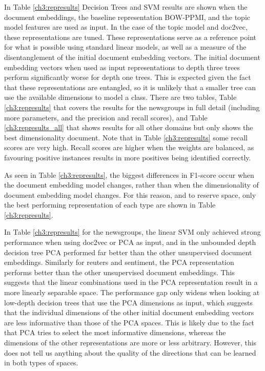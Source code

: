 In Table \ref{ch3:represults} Decision Trees and SVM results are shown when the document embeddings, the baseline representation BOW-PPMI, and the topic model features are used as input. In the case of the topic model and doc2vec, these representations are tuned. These representations serve as a reference point for what is possible using standard linear models, as well as a measure of the disentanglement of the initial  document embedding vectors. The initial  document embedding vectors when used as input representations to depth three trees perform significantly worse for depth one trees. This is expected given the fact that these representations are entangled, so it is unlikely that a smaller tree can use the available dimensions to model a class. There are two tables, Table \ref{ch3:represults} that covers the results for the newsgroups in full detail (including more parameters, and the precision and recall scores), and Table \ref{ch3:represults_all} that shows results for all other domains but only shows the best dimensionality document.  Note that in Table \ref{ch3:represults} some recall scores are very high.  Recall scores are higher when the weights are balanced, as favouring  positive instances results in more positives being identified correctly. 


As seen in  Table \ref{ch3:represults}, the biggest differences in F1-score occur when the document embedding model changes, rather than when the dimensionality of document embedding model changes. For this reason, and to reserve space, only the best performing representation of each type are shown in Table \ref{ch3:represults}.  

In  Table \ref{ch3:represults} for the newsgroups, the linear SVM only achieved strong performance when using   doc2vec or PCA as input, and in the  unbounded depth decision tree PCA performed far better than the other unsupervised document embeddings. Similarly for reuters and sentiment, the PCA representation performs better than the other unsupervised document embeddings. This suggests that the linear combinations used in the PCA representation result in a more linearly separable space. The performance gap only widens when looking at low-depth decision trees that use the PCA dimensions as input, which suggests that the individual dimensions of the other initial document embedding vectors are less informative than those of the PCA spaces. This is likely due to the fact that   PCA tries to select the most informative dimensions, whereas the dimensions of the other representations are more or less arbitrary. However, this does not tell us anything about the quality of the directions that can be learned in both types of spaces. 

